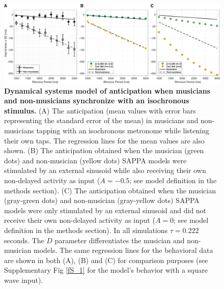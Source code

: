 \documentclass{report}
\begin{document}
\begin{figure}
    \centering
    \includegraphics[width=1.0\textwidth]{figures/fig2_2.png}
    \caption[Dynamical systems model of anticipation when musicians and non-musicians synchronize with an isochronous stimulus]{\textbf{Dynamical systems model of anticipation when musicians and non-musicians synchronize with an isochronous stimulus.} (A) The anticipation (mean values with error bars representing the standard error of the mean) in musicians and non-musicians tapping with an isochronous metronome while listening their own taps. The regression lines for the mean values are also shown. (B) The anticipation obtained when the musician (green dots) and non-musician (yellow dots) SAPPA models were stimulated by an external sinusoid while also receiving their own non-delayed activity as input ($A = -0.5$; see model definition in the methods section). (C) The anticipation obtained when the musician (gray-green dots) and non-musician (gray-yellow dots) SAPPA models were only stimulated by an external sinusoid and did not receive their own non-delayed activity as input ($A = 0$; see model definition in the methods section). In all simulations $\tau = 0.222$ seconds. The $D$ parameter differentiates the musician and non-musician models. The same regression lines for the behavioral data are shown in both (A), (B) and (C) for comparison purposes (see Supplementary Fig \ref{fS_1} for the model's behavior with a square wave input).}
    \label{f2_2}
\end{figure}
\end{document}
